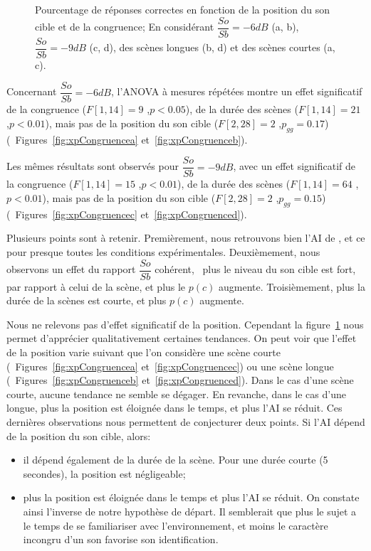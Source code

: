 \begin{figure}[t]
        \caption[Pourcentage de réponses correctes en fonction de la position du son cible et de la congruence.]{Pourcentage de réponses correctes en fonction de la position du son cible et de la congruence; En considérant $\dfrac{So}{Sb}=-6dB$ (a, b), $\dfrac{So}{Sb}=-9dB$ (c, d), des scènes longues (b, d) et des scènes courtes (a, c).}\label{fig:xpCongruence}
\end{figure}

Concernant $\dfrac{So}{Sb}=-6dB$, l'ANOVA à mesures répétées montre un effet significatif de la congruence ($F[1,14]=9$ ,$p<0.05$), de la durée des scènes ($F[1,14]=21$ ,$p<0.01$), mais pas de la position du son cible ($F[2,28]=2$ ,$p_{gg}=0.17$) (\cf~Figures~\ref{fig:xpCongruencea} et~\ref{fig:xpCongruenceb}).

Les mêmes résultats sont observés pour $\dfrac{So}{Sb}=-9dB$, avec un effet significatif de la congruence ($F[1,14]=15$ ,$p<0.01$), de la durée des scènes ($F[1,14]=64$ ,$p<0.01$), mais pas de la position du son cible ($F[2,28]=2$ ,$p_{gg}=0.15$) (\cf~Figures~\ref{fig:xpCongruencec} et~\ref{fig:xpCongruenced}).

Plusieurs points sont à retenir. Premièrement, nous retrouvons bien l'AI de \citep{gygi2011incongruency}, et ce pour presque toutes les conditions expérimentales. Deuxièmement, nous observons un effet du rapport $\dfrac{So}{Sb}$ cohérent, \ie~plus le niveau du son cible est fort, par rapport à celui de la scène, et plus le $p(c)$ augmente. Troisièmement, plus la durée de la scènes est courte, et plus $p(c)$ augmente.

Nous ne relevons pas d'effet significatif de la position. Cependant la figure~\ref{fig:xpCongruence} nous permet d'apprécier qualitativement certaines tendances. On peut voir que l'effet de la position varie suivant que l'on considère une scène courte (\cf~Figures~\ref{fig:xpCongruencea} et~\ref{fig:xpCongruencec}) ou une scène longue (\cf~Figures~\ref{fig:xpCongruenceb} et~\ref{fig:xpCongruenced}). Dans le cas d'une scène courte, aucune tendance ne semble se dégager. En revanche, dans le cas d'une longue, plus la position est éloignée dans le temps, et plus l'AI se réduit. Ces dernières observations nous permettent de conjecturer deux points. Si l'AI dépend de la position du son cible, alors:

\begin{itemize}
\item il dépend également de la durée de la scène. Pour une durée courte (5 secondes), la position est négligeable;
\item plus la position est éloignée dans le temps et plus l'AI se réduit. On constate ainsi l'inverse de notre hypothèse de départ. Il semblerait que plus le sujet a le temps de se familiariser avec l'environnement, et moins le caractère incongru d'un son favorise son identification. 
\end{itemize}